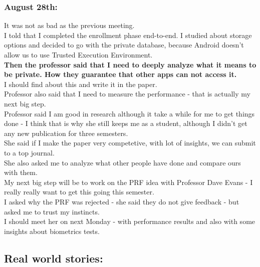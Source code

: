 \documentclass[11pt]{article}
\begin{document}
\subsubsection*{August 28th:}
It was not as bad as the previous meeting.\\
I told that I completed the enrollment phase end-to-end. I studied about storage options and decided to go with the private database, because Android 
doesn't allow us to use Trusted Execution Environment.\\
\textbf{Then the professor said that I need to deeply analyze what it means to be private. How they guarantee that other apps can not access it.}\\
I should find about this and write it in the paper.\\
Professor also said that I need to measure the performance - that is actually my next big step.\\
Professor said I am good in research although it take a while for me to get things done - I think that is why she still keeps me as a student, 
although I didn't get any new publication for three semesters.\\
She said if I make the paper very competetive, with lot of insights, we can submit to a top journal.\\
She also asked me to analyze what other people have done and compare ours with them.\\
My next big step will be to work on the PRF idea with Professor Dave Evans - I really really want to get this going this semester.\\
I asked why the PRF was rejected - she said they do not give feedback - but asked me to trust my instincts.\\
I should meet her on next Monday - with performance results and also with some insights about biometrics tests.\\

\subsection*{Real world stories:}
\end{document}
